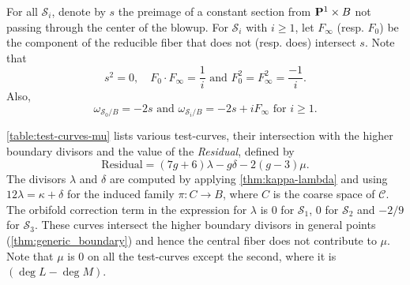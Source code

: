 \documentclass{amsart}
\renewcommand {\P}{{\bf P}}
\newcommand {\from}{{\colon}}
\newcommand{\orb}[1]{{\mathcal #1}}     %
\begin{document}
For all $\orb S_i$, denote by $s$ the preimage of a constant section from $\P^1 \times B$ not passing through the center of the blowup. For $\orb S_i$ with $i \geq 1$, let $F_\infty$ (resp. $F_0$) be the component of the reducible fiber that does not (resp. does) intersect $s$.  Note that 
\[ s^2 = 0, \quad F_0 \cdot F_\infty = \frac{1}{i} \text{ and } F_0^2 = F_\infty^2 = \frac{-1}{i}.\]
Also, 
\[\omega_{\orb S_0/B} = -2s \text{ and }\omega_{\orb S_i/B} =
-2s + i F_\infty \text{ for $i \geq 1$.}\]

\autoref{table:test-curves-mu} lists various test-curves, their intersection with the higher boundary divisors and the value of the \emph{Residual}, defined by
\[ \text{Residual} = (7g+6)\lambda - g \delta - 2(g-3)\mu.\] The divisors $\lambda$ and $\delta$ are computed by applying \autoref{thm:kappa-lambda} and using $12 \lambda = \kappa + \delta$ for the induced family $\pi \from C \to B$, where $C$ is the coarse space of $\orb C$. The orbifold correction term in the expression for $\lambda$ is $0$ for $\orb S_1$, $0$ for $\orb S_2$ and $-2/9$ for $\orb S_3$. These curves intersect the higher boundary divisors in general points (\autoref{thm:generic_boundary}) and hence the central fiber does not contribute to $\mu$. Note that $\mu$ is $0$ on all the test-curves except the second, where it is $(\deg L - \deg M)$. 
\end{document}
